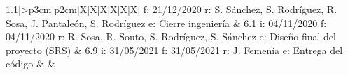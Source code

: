 \begin{table}[H]
\begin{adjustwidth}{-1cm}{-1cm}
\begin{tabularx}{1.1\textwidth}{|>{}p{3cm}|p{2cm}|X|X|X|X|X|X|}
			f:  21/12/2020\newline
			r: S. Sánchez, S. Rodríguez, R. Sosa, J. Pantaleón, S. Rodríguez\newline
			e: Cierre ingeniería                                      & 6.1 \newline
			i: 04/11/2020\newline
			f: 04/11/2020\newline
			r: R. Sosa, R. Souto, S. Rodríguez, S. Sánchez\newline
			e: Diseño final del proyecto (SRS)                        & 6.9 \newline
			i: 31/05/2021\newline
			f:  31/05/2021\newline
			r: J. Femenía\newline
			e: Entrega del código                                     &              &                                                                                                                                                     \\
			\hline
		\end{tabularx}
	\end{adjustwidth}
	\caption{Tabla de planificación 2}
\end{table}

